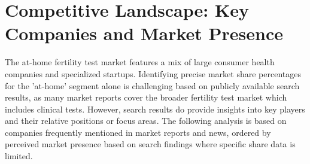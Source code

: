 \documentclass{article}
\begin{document}
\section{Competitive Landscape: Key Companies and Market Presence}

The at-home fertility test market features a mix of large consumer health companies and specialized startups. Identifying precise market share percentages for the 'at-home' segment alone is challenging based on publicly available search results, as many market reports cover the broader fertility test market which includes clinical tests. However, search results do provide insights into key players and their relative positions or focus areas. The following analysis is based on companies frequently mentioned in market reports and news, ordered by perceived market presence based on search findings where specific share data is limited.
\end{document}
